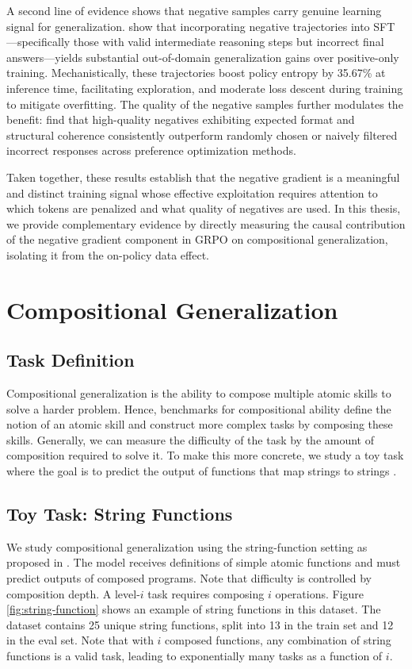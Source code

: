 \documentclass[12pt]{cmuthesis}
\begin{document}
A second line of evidence shows that negative samples carry genuine learning signal for generalization.
\citet{tian_learning_2026} show that incorporating negative trajectories into SFT---specifically those with valid intermediate reasoning steps but incorrect final answers---yields substantial out-of-domain generalization gains over positive-only training.
Mechanistically, these trajectories boost policy entropy by 35.67\% at inference time, facilitating exploration, and moderate loss descent during training to mitigate overfitting.
The quality of the negative samples further modulates the benefit: \citet{di_not_2026} find that high-quality negatives exhibiting expected format and structural coherence consistently outperform randomly chosen or naively filtered incorrect responses across preference optimization methods.

Taken together, these results establish that the negative gradient is a meaningful and distinct training signal whose effective exploitation requires attention to which tokens are penalized and what quality of negatives are used.
In this thesis, we provide complementary evidence by directly measuring the causal contribution of the negative gradient component in GRPO on compositional generalization, isolating it from the on-policy data effect.


\chapter{Compositional Generalization}
\section{Task Definition}
Compositional generalization is the ability to compose multiple atomic skills to solve a harder problem. Hence, benchmarks for compositional ability define the notion of an atomic skill and construct more complex tasks by composing these skills. Generally, we can measure the difficulty of the task by the amount of composition required to solve it. To make this more concrete, we study a toy task where the goal is to predict the output of functions that map strings to strings \citep{yuanLLMsLearnNewSkills2025}.

\section{Toy Task: String Functions}
\label{sec:string-function}
We study compositional generalization using the string-function setting as proposed in \citet{yuanLLMsLearnNewSkills2025}. The model receives definitions of simple atomic functions and must predict outputs of composed programs.
Note that difficulty is controlled by composition depth. A level-$i$ task requires composing $i$ operations. Figure \ref{fig:string-function} shows an example of string functions in this dataset. The dataset contains 25 unique string functions, split into 13 in the train set and 12 in the eval set. Note that with $i$ composed functions, any combination of string functions is a valid task, leading to exponentially many tasks as a function of $i$.
\end{document}
